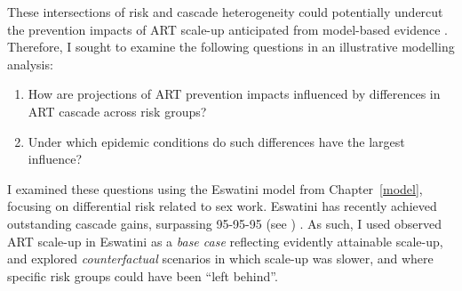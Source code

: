 These intersections of risk and cascade heterogeneity
could potentially undercut the prevention impacts of ART scale-up
anticipated from model-based evidence \cite{Baral2019}.
Therefore, I sought to examine the following questions
in an illustrative modelling analysis:
\begin{enumerate}
  \item\label{obj:art.1} How are projections of ART prevention impacts
    influenced by differences in ART cascade across risk groups?
  \item\label{obj:art.2} Under which epidemic conditions
    do such differences have the largest influence?
\end{enumerate}
I examined these questions using the Eswatini model from Chapter~\ref{model},
focusing on differential risk related to sex work.
Eswatini has recently achieved outstanding cascade gains, surpassing 95-95-95
(see ) \cite{Walsh2020,AIDSinfo}.
As such, I used observed ART scale-up in Eswatini as a \emph{base case}
reflecting evidently attainable scale-up,
and explored \emph{counterfactual} scenarios in which scale-up was slower,
and where specific risk groups could have been ``left behind''.
